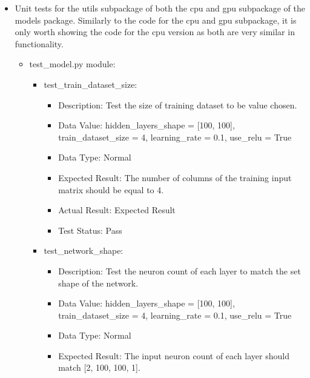 \documentclass[./project-report/src/latex/project-report.tex]{subfiles}
\begin{document}
\begin{itemize}
    \label{sec:models-utils-unit-tests}
    \item Unit tests for the utils subpackage of both the cpu and gpu subpackage of the models package. Similarly to the code for the cpu and gpu subpackage, it is 
          only worth showing the code for the cpu version as both are very similar in functionality.
        \begin{itemize}
            \item test\_model.py module:
				\begin{itemize}
					\item test\_train\_dataset\_size:
					\begin{itemize}
						\item Description: Test the size of training dataset to be value chosen.
						\item Data Value: \newline
							hidden\_layers\_shape = [100, 100], \newline
                         	train\_dataset\_size = 4, \newline
                         	learning\_rate = 0.1, \newline
                         	use\_relu = True
						\item Data Type: Normal
						\item Expected Result: The number of columns of the training input matrix should be equal to 4.
						\item Actual Result: Expected Result
						\item Test Status: Pass
					\end{itemize}
					\item test\_network\_shape:
					\begin{itemize}
						\item Description: Test the neuron count of each layer to match the set shape of the network.
						\item Data Value: \newline
							hidden\_layers\_shape = [100, 100], \newline
                         	train\_dataset\_size = 4, \newline
                         	learning\_rate = 0.1, \newline
                         	use\_relu = True
						\item Data Type: Normal
						\item Expected Result: The input neuron count of each layer should match [2, 100, 100, 1]. 

\end{itemize}
\end{itemize}
\end{itemize}
\end{itemize}
\end{document}
